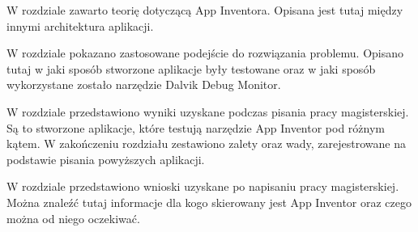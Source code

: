W rozdziale  zawarto teorię dotyczącą App Inventora. Opisana jest tutaj między innymi architektura aplikacji.

W rozdziale  pokazano zastosowane podejście do rozwiązania problemu. Opisano tutaj w jaki sposób stworzone aplikacje były testowane oraz w jaki sposób wykorzystane zostało narzędzie Dalvik Debug Monitor.

W rozdziale  przedstawiono wyniki uzyskane podczas pisania pracy magisterskiej. Są to stworzone aplikacje, które testują narzędzie App Inventor pod różnym kątem. W zakończeniu rozdziału zestawiono zalety oraz wady, zarejestrowane na podstawie pisania powyższych aplikacji.

W rozdziale  przedstawiono wnioski uzyskane po napisaniu pracy magisterskiej. Można znaleźć tutaj informacje dla kogo skierowany jest App Inventor oraz czego można od niego oczekiwać.












